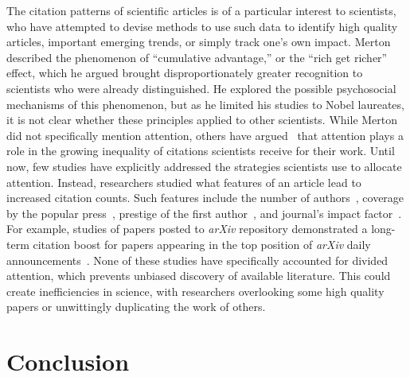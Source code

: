 \documentclass[10pt]{bmc_article}
\newenvironment{bmcformat}{\baselineskip20pt\sloppy\setboolean{publ}{false}}{\baselineskip20pt\sloppy}
\begin{document}
\begin{bmcformat}
The citation patterns of scientific articles is of a particular interest to scientists, who have attempted to devise methods to use such data to identify high quality articles,  important emerging trends, or simply track one's own impact.
Merton~\cite{Merton68} described the phenomenon of ``cumulative advantage,'' or the ``rich get richer'' effect, which he argued brought disproportionately greater recognition to scientists who were already distinguished. He explored the possible psychosocial mechanisms of this phenomenon, but as he limited his studies to Nobel laureates, it is not clear whether these principles applied to other scientists.
While Merton did not specifically mention attention, others have  argued~\cite{Klamer02,Franck99} that attention plays a role in the growing inequality of citations scientists receive for their work.  Until now, few studies have explicitly addressed the strategies scientists use to allocate attention. Instead, researchers studied what  features of an article lead to increased citation counts. Such features include the number of authors~\cite{Wuchty07}, coverage by the popular press~\cite{Phillips91}, prestige of the first author~\cite{Merton68}, and journal's impact factor~\cite{Lariviere09}. For example, studies of papers posted to \emph{arXiv} repository  demonstrated a long-term citation boost for papers appearing in the top position of \emph{arXiv} daily announcements~\cite{Dietrich08,arxiv-visibility}.
None of these studies have specifically accounted for divided attention, which prevents unbiased discovery of available literature.
This could create inefficiencies in science, with researchers overlooking some high quality papers or unwittingly duplicating the work of others.





\section{Conclusion}


\end{bmcformat}
\end{document}

